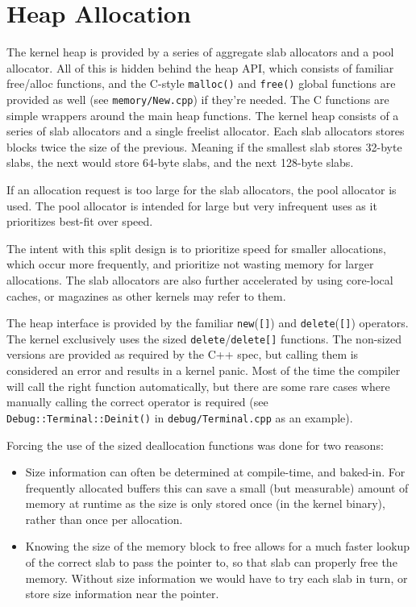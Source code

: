 \section{Heap Allocation}
\label{Heap}
The kernel heap is provided by a series of aggregate slab allocators and a pool allocator. All of this is hidden behind the heap API, which consists of familiar free/alloc functions, and the C-style \verb|malloc()| and \verb|free()| global functions are provided as well (see \verb|memory/New.cpp|) if they're needed. The C functions are simple wrappers around the main heap functions.
The kernel heap consists of a series of slab allocators and a single freelist allocator. Each slab allocators stores blocks twice the size of the previous. Meaning if the smallest slab stores 32-byte slabs, the next would store 64-byte slabs, and the next 128-byte slabs. 

If an allocation request is too large for the slab allocators, the pool allocator is used. The pool allocator is intended for large but very infrequent uses as it prioritizes best-fit over speed.

The intent with this split design is to prioritize speed for smaller allocations, which occur more frequently, and prioritize not wasting memory for larger allocations. The slab allocators are also further accelerated by using core-local caches, or magazines as other kernels may refer to them.

The heap interface is provided by the familiar \verb|new|(\verb|[]|) and \verb|delete|(\verb|[]|) operators. The kernel exclusively uses the sized \verb|delete|/\verb|delete[]| functions. The non-sized versions are provided as required by the C++ spec, but calling them is considered an error and results in a kernel panic. Most of the time the compiler will call the right function automatically, but there are some rare cases where manually calling the correct operator is required (see \verb|Debug::Terminal::Deinit()| in \verb|debug/Terminal.cpp| as an example).

Forcing the use of the sized deallocation functions was done for two reasons:

\begin{itemize}
    \item Size information can often be determined at compile-time, and baked-in. For frequently allocated buffers this can save a small (but measurable) amount of memory at runtime as the size is only stored once (in the kernel binary), rather than once per allocation.
    \item Knowing the size of the memory block to free allows for a much faster lookup of the correct slab to pass the pointer to, so that slab can properly free the memory. Without size information we would have to try each slab in turn, or store size information near the pointer.
\end{itemize}

